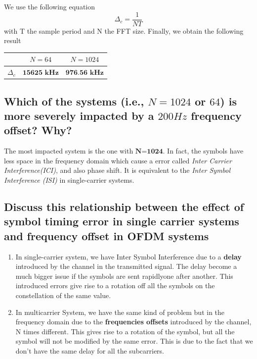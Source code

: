 \documentclass[frenchb, oneside, headings=normal]{scrartcl}
\begin{document}
We use the following equation
\begin{equation}
\Delta_c=\frac{1}{NT}
\end{equation}
with T the sample period and N the FFT size. Finally, we obtain the following result

\begin{center}
	\begin{tabular}{c|c|c}
		  & $N=64$ & $N=1024$\\
		  \hline
	$\Delta_c$ & $\textbf{15625~kHz}$ & $\textbf{976.56 kHz}$ \\
	\end{tabular}
	\label{tab3}
\end{center}

\subsection{Which of the systems (i.e., $N = 1024$ or $64$) is more severely impacted by a $200 Hz$ frequency offset? Why?}

The most impacted system is the one with $\textbf{N=1024}$. In fact, the symbols have less space in the frequency domain which cause a error called \textit{Inter Carrier Interference(ICI)}, and also phase shift. It is equivalent to the \textit{Inter Symbol Interference (ISI)} in single-carrier systems.

\subsection{Discuss this relationship between the effect of symbol timing error in single carrier systems and frequency offset in OFDM systems}

\begin{enumerate}
\item In single-carrier system, we have Inter Symbol Interference due to a \textbf{delay} introduced by the channel in the transmitted signal. The delay become a much bigger issue if the symbols are sent rapidlyone after another. This introduced errors give rise to a rotation off all the symbols on the constellation of the same value.

\item In multicarrier System, we have the same kind of problem but in the frequency domain due to the \textbf{frequencies offsets} introduced by the channel, N times different. This gives rise to a rotation of the symbol, but all the symbol will not be modified by the same error. This is due to the fact that we don't have the same delay for all the subcarriers.

\end{enumerate}
\end{document}
